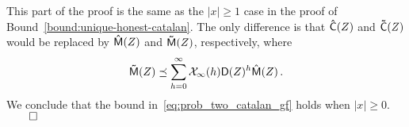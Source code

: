   This part of the proof is the same as the $|x| \geq 1$ case 
  in the proof of Bound~\ref{bound:unique-honest-catalan}. 
  The only difference is that 
  $\mathsf{\hat{C}}(Z)$ and $\mathsf{\tilde{C}}(Z)$ would be replaced by 
  $\mathsf{\hat{M}}(Z)$ and $\mathsf{\tilde{M}}(Z)$, respectively, where 
  \[
    \mathsf{\tilde{M}}(Z)\preceq \sum_{h = 0}^\infty \mathcal{X}_\infty(h) \mathsf{D}(Z)^h \mathsf{\hat{M}}(Z)
    \,.
  \]
  We conclude that the bound
  in~\eqref{eq:prob_two_catalan_gf} holds when $|x| \geq 0$. 
  \hfill$\qed$
